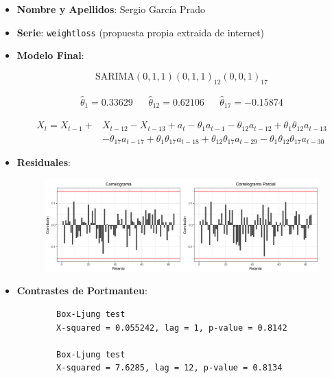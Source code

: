 \documentclass[a4paper, spanish, 11pt]{article}
\begin{document}
  \thispagestyle{empty}
  \begin{itemize}

    \item \textbf{Nombre y Apellidos}: Sergio García Prado

    \item \textbf{Serie}: \texttt{weightloss} (propuesta propia extraida de internet)

    \item \textbf{Modelo Final}:

    \begin{equation*}
       \text{SARIMA}(0, 1, 1)(0, 1, 1)_{12}(0, 0, 1)_{17}
    \end{equation*}

    \begin{align*}
      \widehat{\theta}_{1} = 0.33629 &&  \widehat{\theta}_{12} = 0.62106 && \widehat{\theta}_{17} =-0.15874
    \end{align*}

    \begin{equation*}
      \begin{split}
        X_t = X_{t - 1} + &X_{t - 12} - X_{t - 13} + a_t - \theta_{1}a_{t - 1} - \theta_{12}a_{t - 12} + \theta_{1}\theta_{12}a_{t - 13} \\
        &- \theta_{17}a_{t - 17} + \theta_{1}\theta_{17}a_{t - 18} + \theta_{12}\theta_{17}a_{t - 29} - \theta_{1}\theta_{12}\theta_{17}a_{t - 30}
      \end{split}
    \end{equation*}

    \item \textbf{Residuales}:

    \begin{figure}[H]
      \centering
      \includegraphics[width=\textwidth]{validation-2-acf-pacf}
    \end{figure}

    \item \textbf{Contrastes de Portmanteu}:
    \begin{table}[H]
      \begin{verbatim}
        Box-Ljung test
        X-squared = 0.055242, lag = 1, p-value = 0.8142

        Box-Ljung test
        X-squared = 7.6285, lag = 12, p-value = 0.8134
      \end{verbatim}
    \end{table}

  \end{itemize}
\end{document}
